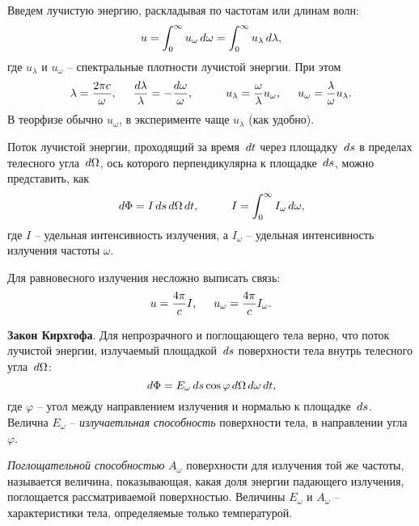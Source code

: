 
Введем лучистую энергию, раскладывая по частотам или длинам волн:
\begin{equation*}
    u = \int_0^\infty u_\omega \, d \omega = \int_{0}^{\infty} u_\lambda \, d \lambda,
\end{equation*}
где $u_\lambda$ и $u_\omega$ -- спектральные плотности лучистой энергии. При этом
\begin{equation*}
    \lambda = \frac{2 \pi c}{\omega},
    \hspace{5 mm} 
    \frac{d \lambda}{\lambda} = - \frac{d \omega}{\omega},
    \hspace{10 mm} 
    u_\lambda = \frac{\omega}{\lambda} u_\omega,
    \hspace{5 mm} 
    u_\omega = \frac{\lambda}{\omega}  u_\lambda.
\end{equation*}
В теорфизе обычно $u_\omega$, в эксперименте чаще $u_\lambda$ (как удобно). 

Поток лучистой энергии, проходящий за время $\, d t$ через площадку $\, d s$ в пределах телесного угла $\, d \Omega$, ось которого перпендикулярна к площадке $\, d s$, можно представить, как
\begin{equation*}
    \d \Phi = I \d s \d \Omega \d t,
    \hspace{10 mm} 
    I = \int_{0}^{\infty} I_\omega \d \omega,
\end{equation*}
где $I$ -- удельная интенсивность излучения, а $I_\omega$ -- удельная интенсивность излучения частоты $\omega$. 


Для равновесного излучения несложно выписать связь:
\begin{equation*}
    u = \frac{4 \pi}{c} I,
    \hspace{5 mm} 
    u_\omega = \frac{4 \pi}{c} I_\omega. 
\end{equation*}



\textbf{Закон Кирхгофа}. Для непрозрачного и поглощающего тела верно, что поток лучистой энергии, излучаемый площадкой $\, d s$ поверхности тела внутрь телесного угла $\, d \Omega$:
\begin{equation*}
    \, d \Phi = E_\omega \, d s \cos \varphi \, d \Omega \, d \omega \, d t,
\end{equation*}
где $\varphi$ -- угол между направлением излучения и нормалью к площадке $\, d s$. Велична $E_\omega$ -- \textit{излучаетльная способность} поверхности тела, в направлении угла $\varphi$. 


\textit{Поглощательной способностью} $A_\omega$ поверхности для излучения той же частоты, называется величина, показывающая, какая доля энергии падающего излучения, поглощается рассматриваемой поверхностью. Величины $E_\omega$ и $A_\omega$ -- характеристики тела, определяемые только температурой. 



